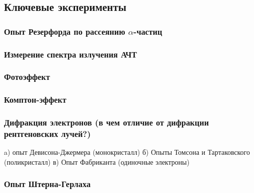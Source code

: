 \subsection{Ключевые эксперименты}

\subsubsection{Опыт Резерфорда по рассеянию $\alpha$-частиц}

\subsubsection{Измерение спектра излучения АЧТ}

\subsubsection{Фотоэффект}

\subsubsection{Комптон-эффект}

\subsubsection{Дифракция электронов (в чем отличие от дифракции рентгеновских лучей?)}
a) опыт Девисона-Джермера (монокристалл)
б) Опыты Томсона  и Тартаковского (поликристалл)
в) Опыт Фабриканта (одиночные электроны)

\subsubsection{Опыт Штерна-Герлаха}
